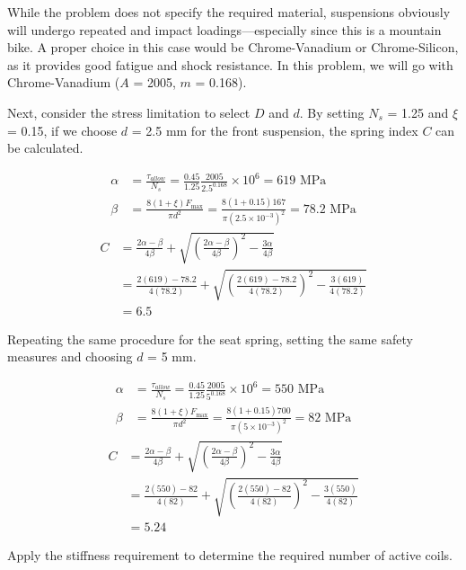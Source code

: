\documentclass[a4paper,openany,nobib]{tufte-book}
\begin{document}
{{While the problem does not specify the required material, suspensions
obviously will undergo repeated and impact loadings---especially since
this is a mountain bike. A proper choice in this case would be
Chrome-Vanadium or Chrome-Silicon, as it provides good fatigue and shock
resistance. In this problem, we will go with Chrome-Vanadium (\(A\) =
2005, \(m\) = 0.168).

Next, consider the stress limitation to select \(D\) and \(d\). By setting
\(N_s\) = 1.25 and \(\xi\) = 0.15, if we choose \(d\) = 2.5 mm for the front
suspension, the spring index \(C\) can be calculated.

$$\begin{aligned}
    \alpha  &= \frac{\tau _{allow}}{N_s} = \frac{0.45}{1.25}\frac{2005}{2.5^{0.168}} \times 10^6 = 619 \text{ MPa} \\ 
    \beta  &= \frac{8(1 + \xi )F_{\max}}{\pi d^2} = \frac{8(1 + 0.15)167}{\pi (2.5 \times 10^{-3})^2} = 78.2 \text{ MPa}
  \end{aligned}$$ $$\begin{aligned}
    C &= \frac{2\alpha  - \beta}{4\beta} + \sqrt {\left( \frac{2\alpha  - \beta}{4\beta} \right)^2 - \frac{3\alpha}{4\beta}}  \\ 
      & = \frac{2(619) - 78.2}{4(78.2)} + \sqrt {\left( \frac{2(619) - 78.2}{4(78.2)} \right)^2 - \frac{3(619)}{4(78.2)}}  \\ 
      &= 6.5 
  \end{aligned}$$

Repeating the same procedure for the seat spring, setting the same
safety measures and choosing \(d\) = 5 mm.

$$\begin{aligned}
    \alpha &= \frac{\tau_{allow}}{N_s} = \frac{0.45}{1.25}\frac{2005}{5^{0.168}} \times 10^6 = 550\text{ MPa} \\ 
    \beta &= \frac{8(1 + \xi )F_{\max}}{\pi d^2} = \frac{8(1 + 0.15)700}{\pi (5 \times 10^{-3})^2} = 82\text{ MPa}
  \end{aligned}$$ $$\begin{aligned}
    C &= \frac{2\alpha  - \beta}{4\beta} + \sqrt {\left( \frac{2\alpha  - \beta}{4\beta} \right)^2 - \frac{3\alpha}{4\beta}}  \\ 
      &= \frac{2(550) - 82}{4(82)} + \sqrt {\left( \frac{2(550) - 82}{4(82)} \right)^2 - \frac{3(550)}{4(82)}}  \\ 
      &= 5.24
  \end{aligned}$$

Apply the stiffness requirement to determine the required number of
active coils.

}}
\end{document}
